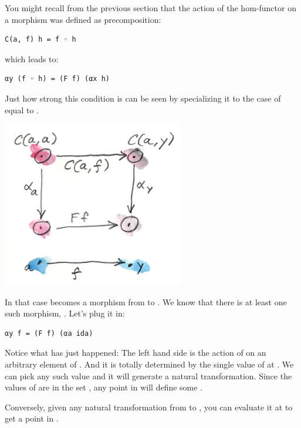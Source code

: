You might recall from the previous section that the action of the
hom-functor  on a morphism  was defined as
precomposition:

\begin{Verbatim}[commandchars=\\\{\}]
C(a, f) h = f ◦ h
\end{Verbatim}

which leads to:

\begin{Verbatim}[commandchars=\\\{\}]
αy (f ◦ h) = (F f) (αx h)
\end{Verbatim}

Just how strong this condition is can be seen by specializing it to the
case of  equal to .

\includegraphics[width=3.12500in]{images/yoneda2.png}

In that case  becomes a morphism from  to
. We know that there is at least one such morphism,
. Let's plug it in:

\begin{Verbatim}[commandchars=\\\{\}]
αy f = (F f) (αa ida)
\end{Verbatim}

Notice what has just happened: The left hand side is the action of
 on an arbitrary element  of . And
it is totally determined by the single value of  at
. We can pick any such value and it will generate a natural
transformation. Since the values of  are in the set
, any point in  will define some .

Conversely, given any natural transformation  from
 to , you can evaluate it at  to
get a point in .

